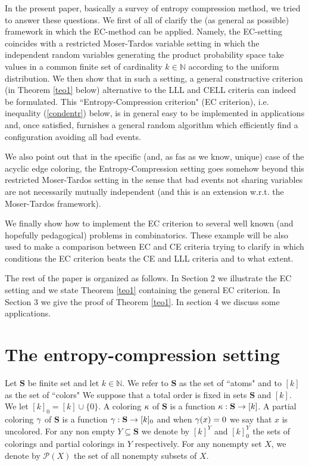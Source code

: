 \documentclass[11pt]{article}
\let\\=\noindent
\def\0{\emptyset}
\begin{document}
\\In the present  paper,   basically a survey of entropy compression method, we tried to answer these questions.
We first of all  of clarify the (as general as possible) framework in which the EC-method can be applied.
Namely, the EC-setting coincides with  a restricted  Moser-Tardos variable setting in which the
independent random variables generating
the product  probability space  take  values in a common  finite set of  cardinality $k\in \mathbb{N}$ according to the uniform distribution.
We then show that in such a  setting,  a  general constructive criterion (in Theorem \ref{teo1} below) alternative to the  LLL  and
CELL criteria can indeed be formulated.
This ``Entropy-Compression criterion" (EC criterion), i.e.  inequality (\ref{condentr})  below,
is  in general easy to be implemented
 in applications and, once satisfied, furnishes
a general random algorithm  which  efficiently find  a configuration  avoiding all bad events.

\\We also point out that  in the specific (and, as fas as we know, unique) case of
the acyclic edge coloring, the Entropy-Compression setting  goes somehow beyond this restricted
Moser-Tardos setting in the sense that
bad events not sharing variables are not necessarily mutually independent (and this is an extension
 w.r.t. the Moser-Tardos framework).

\\We finally  show  how to implement the EC criterion  to several well known (and hopefully pedagogical)
problems in combinatorics.
These example will be also used to make a comparison between EC and CE criteria trying to clarify in which
conditions  the EC criterion beats  the  CE and LLL criteria   and to what extent.

\\The rest of the paper is organized as follows. In Section 2 we illustrate  the EC setting  and we  state Theorem \ref{teo1}
containing the general EC criterion.
In Section 3 we give the proof of Theorem \ref{teo1}. In section 4 we discuss some applications.
\def\0{\emptyset}




\section{The entropy-compression  setting}


\\Let $\mathbf{S}$  be finite set and let $k\in \mathbb{N}$. We refer to $\mathbf{S}$ as the set of ``atoms" and to $[k]$ as the set of ``colors"
We suppose that  a total order is fixed  in sets  $\mathbf{S}$ and $[k]$. We let $[k]_0=[k]\cup\{0\}$.
A coloring $\kappa$  of $\mathbf{S}$ is a function
$\kappa:\mathbf{S}\to [k]$. A partial coloring $\gamma$ of $\mathbf{S}$ is a function $\gamma:\mathbf{S}\to [k]_0$ and
when  $\gamma(x)=0$ we say that $x$ is uncolored. For any non empty $Y\subseteq \mathbf{S}$ we denote by $[k]^Y$ and $[k]_0^Y$
the sets of colorings and partial colorings
in $Y$ respectively. For any nonempty set $X$, we denote by  ${\mathcal P}(X)$  the set of all nonempty subsets of $X$.
\end{document}
